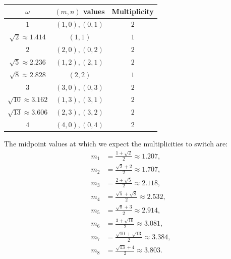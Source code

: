 \documentclass[12pt,a4paper]{article}
\begin{document}
\begin{center}
\begin{tabular}{|c| c| c|}
\toprule
$\omega$ & $(m,n)$ values & Multiplicity \\
\midrule
$1$ & $(1,0),(0,1)$ & $2$ \\
$\sqrt{2}\approx 1.414$ & $(1,1)$ & $1$ \\
$2$ & $(2,0),(0,2)$ & $2$ \\
$\sqrt{5}\approx 2.236$ & $(1,2),(2,1)$ & $2$ \\
$\sqrt{8}\approx 2.828$ & $(2,2)$ & $1$ \\
$3$ & $(3,0),(0,3)$ & $2$ \\
$\sqrt{10}\approx 3.162$ & $(1,3),(3,1)$ & $2$ \\
$\sqrt{13}\approx 3.606$ & $(2,3),(3,2)$ & $2$ \\
$4$ & $(4,0),(0,4)$ & $2$ \\
\bottomrule
\end{tabular}
\end{center}

The midpoint values at which we expect the multiplicities to switch are:
\begin{equation}
\begin{aligned}
    m_1 &= \frac{1+\sqrt{2}}{2} \approx 1.207, \\
    m_2 &= \frac{\sqrt{2}+2}{2} \approx 1.707, \\
    m_3 &= \frac{2+\sqrt{5}}{2} \approx 2.118, \\
    m_4 &= \frac{\sqrt{5}+\sqrt{8}}{2} \approx 2.532, \\
    m_5 &= \frac{\sqrt{8}+3}{2} \approx 2.914, \\
    m_6 &= \frac{3+\sqrt{10}}{2} \approx 3.081, \\
    m_7 &= \frac{\sqrt{10}+\sqrt{13}}{2} \approx 3.384, \\
    m_8 &= \frac{\sqrt{13}+4}{2} \approx 3.803 .
\end{aligned}
\end{equation}
\end{document}
